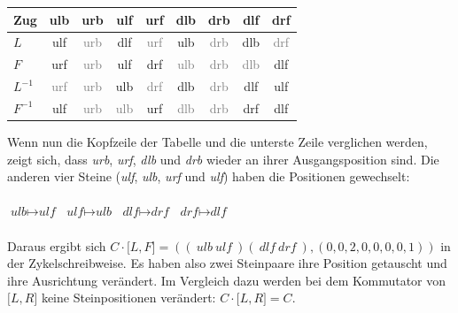 \documentclass[12pt,a4paper, usenames, dvipsnames]{article}
\theoremstyle{mystyle}
\theoremstyle{definition}
\begin{document}
\begin{center}
\begin{tabular}{lcccccccc}
\toprule
\textbf{Zug} & \textbf{ulb} & \textbf{urb} & \textbf{ulf} & \textbf{urf} & \textbf{dlb} & \textbf{drb} & \textbf{dlf} & \textbf{drf} \\

\midrule
$L$ & ulf & \textcolor{gray}{urb} & dlf & \textcolor{gray}{urf} & ulb & \textcolor{gray}{drb} & dlb & \textcolor{gray}{drf} \\

$F$ & urf & \textcolor{gray}{urb} & ulf &  drf & \textcolor{gray}{ulb} & \textcolor{gray}{drb} & \textcolor{gray}{dlb} & dlf \\

$L^{-1}$ & \textcolor{gray}{urf} & \textcolor{gray}{urb} & ulb & \textcolor{gray}{drf} & dlb & \textcolor{gray}{drb} & dlf & ulf \\

$F^{-1}$ \: & ulf & \textcolor{gray}{urb} & \textcolor{gray}{ulb} & urf & \textcolor{gray}{dlb} & \textcolor{gray}{drb} & drf & dlf\\
\bottomrule
\end{tabular}
\end{center}

Wenn nun die Kopfzeile der Tabelle und die unterste Zeile verglichen werden, zeigt sich, dass \textit{urb}, \textit{urf}, \textit{dlb} und \textit{drb} wieder an ihrer Ausgangsposition sind. Die anderen vier Steine (\textit{ulf}, \textit{ulb}, \textit{urf} und \textit{ulf}) haben die Positionen gewechselt: \\
\\
\hspace*{1.5cm } $\textit{ulb} \mapsto \textit{ulf}$ \hspace*{1.5cm }$\textit{ulf}  \mapsto \textit{ulb}$ \hspace*{1.5cm } $\textit{dlf} \mapsto \textit{drf}$ \hspace*{1.5cm } $\textit{drf} \mapsto \textit{dlf}$
\\
\\
Daraus ergibt sich $C \cdot \lbrack L, F \rbrack  = (( \ \textit{ulb} \ \textit{ulf} \ )(\ \textit{dlf} \ \textit{drf} \ ), (0,0,2,0,0,0,0,1) )$ in der Zykelschreibweise. Es haben also zwei Steinpaare ihre Position getauscht und ihre Ausrichtung verändert. Im Vergleich dazu werden bei dem Kommutator von $\lbrack L, R \rbrack$ keine Steinpositionen verändert: $C \cdot \lbrack L, R \rbrack = C $.
\end{document}
